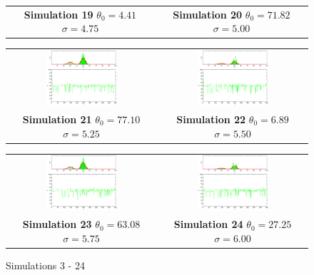 \begin{figure}
\begin{tabular}{cc}
\textbf{Simulation 19} $\theta_0=    4.41$  $\sigma=    4.75$  & \textbf{Simulation 20} $\theta_0=   71.82$  $\sigma=    5.00$
\end{tabular}
\begin{tabular}{cc} 
\includegraphics[width=0.5\textwidth]{ImaginiLatex/MetropolisExample21.eps} &
\includegraphics[width=0.5\textwidth]{ImaginiLatex/MetropolisExample22.eps} \\
\textbf{Simulation 21} $\theta_0=   77.10$  $\sigma=    5.25$  & \textbf{Simulation 22} $\theta_0=    6.89$  $\sigma=    5.50$
\end{tabular}
\begin{tabular}{cc} 
\includegraphics[width=0.5\textwidth]{ImaginiLatex/MetropolisExample23.eps} &
\includegraphics[width=0.5\textwidth]{ImaginiLatex/MetropolisExample24.eps} \\
\textbf{Simulation 23} $\theta_0=   63.08$  $\sigma=    5.75$  & \textbf{Simulation 24} $\theta_0=   27.25$  $\sigma=    6.00$
\end{tabular}
\caption{Simulations 3 - 24}
\end{figure}
